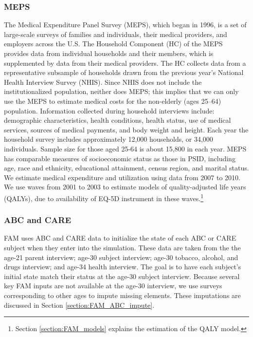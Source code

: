 \subsubsection{MEPS}
\noindent The Medical Expenditure Panel Survey (MEPS), which began in 1996, is a set of large-scale surveys of families and individuals, their medical providers, and employers across the U.S. The Household Component (HC) of the MEPS provides data from 
individual households and their members, which is supplemented by data from their medical providers. 
The HC collects data from a representative subsample of households drawn from the 
previous year's National Health Interview Survey (NHIS). Since NHIS does not include the 
institutionalized population, neither does MEPS; this implies that we can only use the MEPS to 
estimate medical costs for the non-elderly (ages 25--64) population. Information collected during household 
interviews include: demographic characteristics, health conditions, health status, use of medical 
services, sources of medical payments, and body weight and height. Each year the household survey 
includes approximately 12,000 households, or 34,000 individuals. Sample size for those aged 25-64 is 
about 15,800 in each year.  MEPS has comparable measures of socioeconomic status as those in PSID, 
including age, race and ethnicity, educational attainment, census region, and marital status.  We estimate medical expenditure 
and utilization using data from 2007 to 2010. We use waves from 2001 to 2003 to estimate models of quality-adjusted life years (QALYs), due to availability of EQ-5D instrument in these waves.\footnote{Section \ref{section:FAM_models} explains the estimation of the QALY model.} \\


\subsubsection{ABC and CARE}
\noindent FAM uses ABC and CARE data to initialize the state of each ABC or CARE subject when they enter into the simulation.  
These data are taken from the the age-21 parent interview; age-30 subject interview; age-30 tobacco, alcohol, and drugs interview; and age-34 health interview.  
The goal is to have each subject's initial state match their status at the age-30 subject interview. Because several key FAM inputs are not available at the age-30 interview, we use surveys corresponding to other ages to impute missing elements. These imputations are discussed in Section \ref{section:FAM_ABC_impute}. \\

